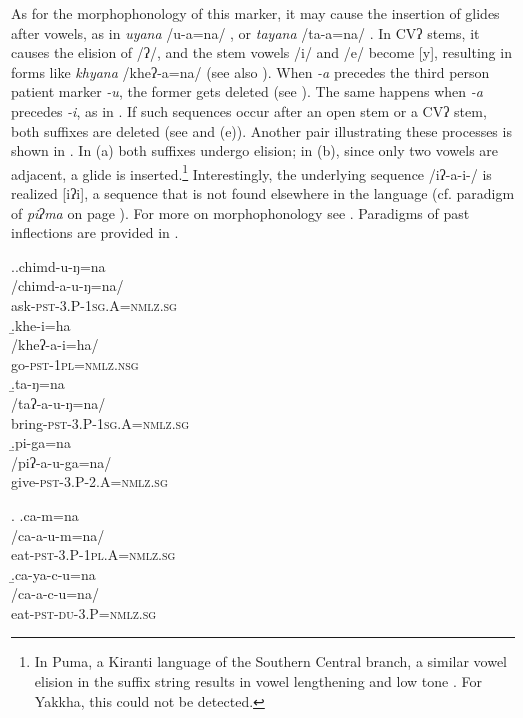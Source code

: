 As for the morphophonology of this marker, it may cause the insertion of glides after vowels, as in \emph{uyana} /u-a=na/ , or \emph{tayana} /ta-a=na/ . In CVʔ stems, it causes the elision of /ʔ/, and the stem vowels /i/ and /e/ become [y], resulting in forms like   \emph{khyana} /kheʔ-a=na/  (see also \Last[a]).  When \emph{-a} precedes the third person patient marker \emph{-u}, the former gets deleted (see \Next[a]). The same happens when \emph{-a} precedes \emph{-i}, as in \Next[b]. If such sequences occur after an open stem or a CVʔ stem, both suffixes are deleted (see \Next[c] and (e)). Another pair illustrating these processes is shown in \NNext. In (a) both suffixes undergo elision; in (b), since only two vowels are adjacent, a glide is inserted.\footnote{In Puma, a Kiranti language of the Southern Central branch, a similar vowel elision in the suffix string results in vowel lengthening and low tone \citep{Bickeletal2006The-Chintang}. For Yakkha, this could not be detected.} Interestingly, the underlying sequence /iʔ-a-i-/ is realized [iʔi], a sequence that is not found elsewhere in the language (cf. paradigm of \emph{piʔma}  on page \pageref{par-pipma-pst}). For more on morphophonology see . Paradigms of past inflections are provided in .

\ex.\a.\glll chimd-u-ŋ=na\\
 /chimd-a-u-ŋ=na/\\
ask{\scshape -pst-3.P-1sg.A=nmlz.sg}\\
\b.\glll khe-i=ha\\
 /kheʔ-a-i=ha/\\
go{\scshape -pst-1pl=nmlz.nsg}\\
\b.\glll ta-ŋ=na \\
/taʔ-a-u-ŋ=na/\\
bring{\scshape -pst-3.P-1sg.A=nmlz.sg}\\
\b.\glll pi-ga=na \\
/piʔ-a-u-ga=na/\\
give{\scshape -pst-3.P-2.A=nmlz.sg}\\

\ex. \a.\glll ca-m=na\\
 /ca-a-u-m=na/\\
eat{\scshape -pst-3.P-1pl.A=nmlz.sg}\\
\b.\glll ca-ya-c-u=na \\
/ca-a-c-u=na/\\
eat{\scshape -pst-du-3.P=nmlz.sg}\\


